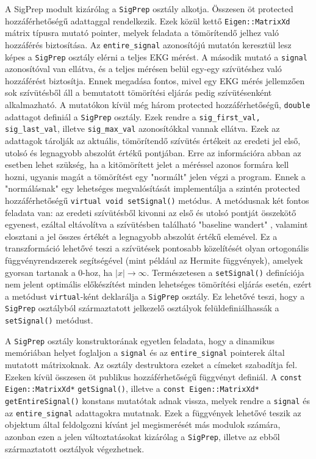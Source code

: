 \documentclass[oneside,titlepage,12pt,a4paper]{report}
\begin{document}
\par A SigPrep modult kizárólag a \texttt{SigPrep} osztály alkotja. Összesen öt protected hozzáférhetőségű adattaggal rendelkezik. Ezek közül kettő \texttt{Eigen::MatrixXd} mátrix típusra mutató pointer, melyek feladata a tömörítendő jelhez való hozzáférés biztosítása. Az \texttt{entire\_signal} azonosítójú mutatón keresztül lesz képes a \texttt{SigPrep} osztály elérni a teljes EKG mérést. A második mutató a \texttt{signal} azonosítóval van ellátva, és a teljes mérésen belül egy-egy szívütéshez való hozzáférést biztosítja. Ennek megadása fontos, mivel egy EKG mérés jellemzően sok szívütésből áll a bemutatott tömörítési eljárás pedig szívütésenként alkalmazható. A mutatókon kívül még három protected hozzáférhetőségű, \texttt{double} adattagot definiál a \texttt{SigPrep} osztály. Ezek rendre a \texttt{sig\_first\_val, sig\_last\_val}, illetve \texttt{sig\_max\_val} azonosítókkal vannak ellátva. Ezek az adattagok tárolják az aktuális, tömörítendő szívütés értékeit az eredeti jel első, utolsó és legnagyobb abszolút értékű pontjában. Erre az információra abban az esetben lehet szükség, ha a kitömörített jelet a méréssel azonos formára kell hozni, ugyanis magát a tömörítést egy "normált" jelen végzi a program. Ennek a "normálásnak" egy lehetséges megvalósítását implementálja a szintén protected hozzáférhetőségű \texttt{virtual void setSignal()} metódus. A metódusnak két fontos feladata van: az eredeti szívütésből kivonni az első és utolsó pontját összekötő egyenest, ezáltal eltávolítva a szívütésben található "baseline wandert" \cite{ecgDataCompressionTech}, valamint elosztani a jel összes értékét a legnagyobb abszolút értékű elemével. Ez a transzformáció lehetővé teszi a szívütések pontosabb közelítését olyan ortogonális függvényrendszerek segítségével (mint például az Hermite függvények), amelyek gyorsan tartanak a 0-hoz, ha $|x| \to \infty$. Természetesen a \texttt{setSignal()} definíciója nem jelent optimális előkészítést minden lehetséges tömörítési eljárás esetén, ezért a metódust \texttt{virtual}-ként deklarálja a \texttt{SigPrep} osztály. Ez lehetővé teszi, hogy a \texttt{SigPrep} osztályból származtatott jelkezelő osztályok felüldefiniálhassák a \texttt{setSignal()} metódust. 
\par A \texttt{SigPrep} osztály konstruktorának egyetlen feladata, hogy a dinamikus memóriában helyet foglaljon a \texttt{signal} és az \texttt{entire\_signal} pointerek által mutatott mátrixoknak. Az osztály destruktora ezeket a címeket szabadítja fel.  \linebreak Ezeken kívül összesen öt publikus hozzáférhetőségű függvényt definiál. \linebreak A \texttt{const Eigen::MatrixXd*} \texttt{getSignal()}, illetve a \texttt{const Eigen::MatrixXd*} \linebreak \texttt{getEntireSignal()} konstans mutatótak adnak vissza, melyek rendre a \texttt{signal} és az \texttt{entire\_signal} adattagokra mutatnak. Ezek a függvények lehetővé teszik az objektum által feldolgozni kívánt jel megismerését más modulok számára, azonban ezen a jelen változtatásokat kizárólag a \texttt{SigPrep}, illetve az ebből származtatott osztályok végezhetnek.
\end{document}

